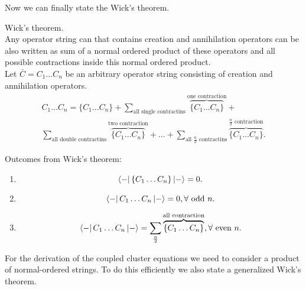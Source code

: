 \documentclass[twoside,english]{uiofysmaster}
\theoremstyle{definition}
\begin{document}
Now we can finally state the Wick's theorem.
\begin{theorem}  Wick's theorem.\\
Any operator string can that contains creation and annihilation operators can be also written as sum of a normal ordered product of these operators and all possible contractions inside this normal ordered product.\\
Let $ \bar{C}=C_1 \dots C_n $ be an arbitrary operator string consisting of creation and annihilation operators.
\begin{gather}
C_1 \dots C_n=\{C_1 \dots C_n\} + \sum_{\text{all single contractins}} \overbrace{ \{ C_1 \dots C_n\} }^\text{one contraction} +\\ \sum_{\text{all double contractins}} \overbrace{ \{ C_1 \dots C_n\} }^\text{two contraction}+ \dots + 
 \sum_{\text{all $\frac{n}{2}$ contractins}} \overbrace{ \{ C_1 \dots C_n\} }^\text{$\frac{n}{2}$ contraction}.
\end{gather}
\end{theorem}
Outcomes from Wick's theorem:
\begin{enumerate}
	\item \[\bra{-} \{C_1 \dots C_n\} \ket{-}=0.\]
	\item \[\bra{-} C_1 \dots C_n \ket{-}=0,  \forall  \text{ odd } n.\]
	\item \[\bra{-} C_1 \dots C_n \ket{-}= \sum_{\frac{n}{2}} \overbrace{ \{C_1 \dots C_n\}}^{\text{all contraction}}, \forall \text{ even } n .\]
\end{enumerate}
For the derivation of the coupled cluster equations we need to consider a product of normal-ordered strings. To do this efficiently we also state a generalized Wick's theorem.
\end{document}
